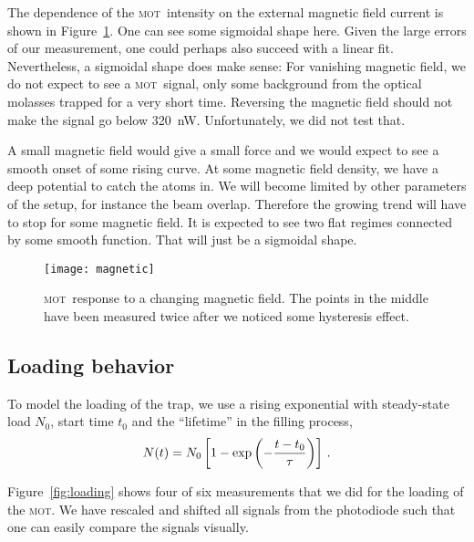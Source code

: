 \documentclass[11pt, english, fleqn, DIV=15, headinclude, BCOR=2cm]{scrreprt}
\newcommand\mot{\textsc{mot}}
\begin{document}


The dependence of the \mot\ intensity on the external magnetic field current is
shown in Figure~\ref{fig:magnetic}. One can see some sigmoidal shape here.
Given the large errors of our measurement, one could perhaps also succeed with
a linear fit. Nevertheless, a sigmoidal shape does make sense: For vanishing
magnetic field, we do not expect to see a \mot\ signal, only some background
from the optical molasses trapped for a very short time. Reversing the magnetic
field should not make the signal go below \SI{320}{\nano\watt}.
Unfortunately, we did not test that.

A small magnetic field would give a small force and we would expect to see a
smooth onset of some rising curve. At some magnetic field density, we have a
deep potential to catch the atoms in. We will become limited by other
parameters of the setup, for instance the beam overlap. Therefore the growing
trend will have to stop for some magnetic field. It is expected to see two flat
regimes connected by some smooth function. That will just be a sigmoidal shape.

\begin{figure}
    \centering
    \texttt{[image: magnetic]}
    \caption{%
        \mot\ response to a changing magnetic field. The points in the middle
        have been measured twice after we noticed some hysteresis effect.
    }
    \label{fig:magnetic}
\end{figure}

\subsection{Loading behavior}

To model the loading of the trap, we use a rising exponential with steady-state
load $N_0$, start time $t_0$ and the \enquote{lifetime} in the filling process,
\[
    N(t) = N_0 \left[ 1 - \exp\left( - \frac{t - t_0}{\tau} \right) \right] \,.
\]

Figure~\ref{fig:loading} shows four of six measurements that we did for the
loading of the \mot. We have rescaled and shifted all signals from the
photodiode such that one can easily compare the signals visually.
\end{document}
